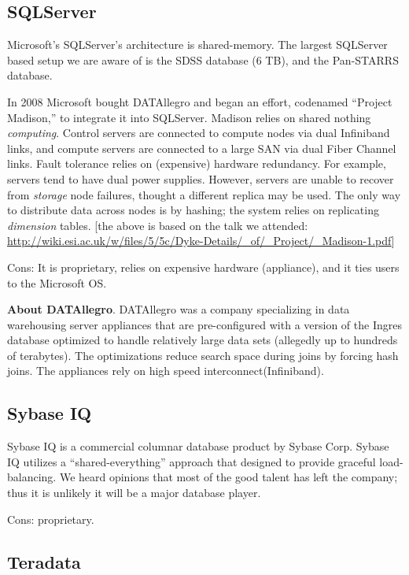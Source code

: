 \documentclass[DM,lsstdraft,toc]{lsstdoc}
\begin{document}
\subsection{SQLServer}\label{sqlserver}

Microsoft's SQLServer's architecture is shared-memory. The largest
SQLServer based setup we are aware of is the SDSS database (6 TB), and
the Pan-STARRS database.

In 2008 Microsoft bought DATAllegro and began an effort, codenamed
``Project Madison,'' to integrate it into SQLServer. Madison relies on
shared nothing \emph{computing}. Control servers are connected to
compute nodes via dual Infiniband links, and compute servers are
connected to a large SAN via dual Fiber Channel links. Fault tolerance
relies on (expensive) hardware redundancy. For example, servers tend to
have dual power supplies. However, servers are unable to recover from
\emph{storage} node failures, thought a different replica may be used.
The only way to distribute data across nodes is by hashing; the system
relies on replicating \emph{dimension} tables. {[}the above is based on
the talk we attended:
\url{http://wiki.esi.ac.uk/w/files/5/5c/Dyke-Details/_of/_Project/_Madison-1.pdf}{]}

Cons: It is proprietary, relies on expensive hardware (appliance), and
it ties users to the Microsoft OS.

\textbf{About DATAllegro}. DATAllegro was a company specializing in data
warehousing server appliances that are pre-configured with a version of
the Ingres database optimized to handle relatively large data sets
(allegedly up to hundreds of terabytes). The optimizations reduce search
space during joins by forcing hash joins. The appliances rely on high
speed interconnect(Infiniband).

\subsection{Sybase IQ}\label{sybase-iq}

Sybase IQ is a commercial columnar database product by Sybase
Corp. Sybase IQ utilizes a ``shared-everything'' approach that
designed to provide graceful load-balancing. We heard opinions that most
of the good talent has left the company; thus it is unlikely it will be
a major database player.

Cons: proprietary.

\subsection{Teradata}\label{teradata}
\end{document}
